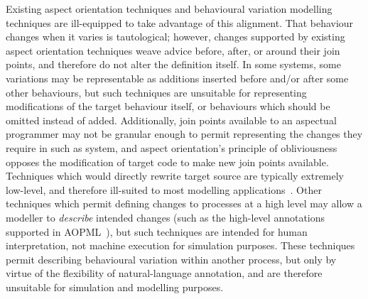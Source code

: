 Existing aspect orientation techniques and behavioural variation modelling
techniques are ill-equipped to take advantage of this alignment. That behaviour
changes when it varies is tautological; however, changes supported by existing
aspect orientation techniques weave advice before, after, or around their join
points, and therefore do not alter the definition itself. In some systems, some
variations may be representable as additions inserted before and/or after some
other behaviours, but such techniques are unsuitable for representing
modifications of the target behaviour itself, or behaviours which should be
omitted instead of added. Additionally, join points available to an aspectual
programmer may not be granular enough to permit representing the changes they
require in such as system, and aspect orientation's principle of obliviousness
opposes the modification of target code to make new join points available.
Techniques which would directly rewrite target source are typically extremely
low-level, and therefore ill-suited to most modelling
applications~\cite{keller1998binary}. Other techniques which permit defining
changes to processes at a high level may allow a modeller to \emph{describe}
intended changes (such as the high-level annotations supported in
AOPML~\cite{Cappelli_AOBPM}), but such techniques are intended for human
interpretation, not machine execution for simulation purposes. These techniques
permit describing behavioural variation within another process, but only by
virtue of the flexibility of natural-language annotation, and are therefore
unsuitable for simulation and modelling purposes.

